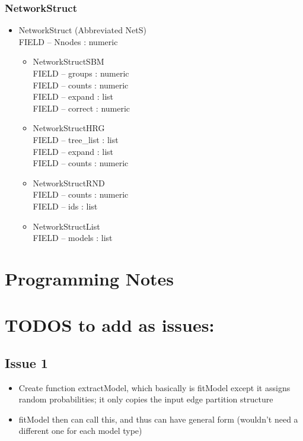 \documentclass[11pt]{article}
\begin{document}
\subsubsection{NetworkStruct}
\begin{itemize}

\item NetworkStruct (Abbreviated NetS)\\
FIELD -- Nnodes : numeric
\begin{itemize}
\item NetworkStructSBM\\
FIELD -- groups : numeric\\
FIELD -- counts : numeric\\
FIELD -- expand : list\\
FIELD -- correct : numeric\\
\item NetworkStructHRG\\
FIELD -- tree\_list : list\\
FIELD -- expand : list\\
FIELD -- counts : numeric\\
\item NetworkStructRND\\
FIELD -- counts : numeric\\
FIELD -- ids : list\\
\item NetworkStructList\\
FIELD -- models : list\\
\end{itemize}
\end{itemize}












\section{Programming Notes}



\section{TODOS to add as issues:}

\subsection*{Issue 1}
\begin{itemize}
\item Create function extractModel, which basically is fitModel except it assigns random probabilities; it only copies the input edge partition structure
\item fitModel then can call this, and thus can have general form (wouldn't need a different one for each model type)
\end{itemize}
\end{document}
